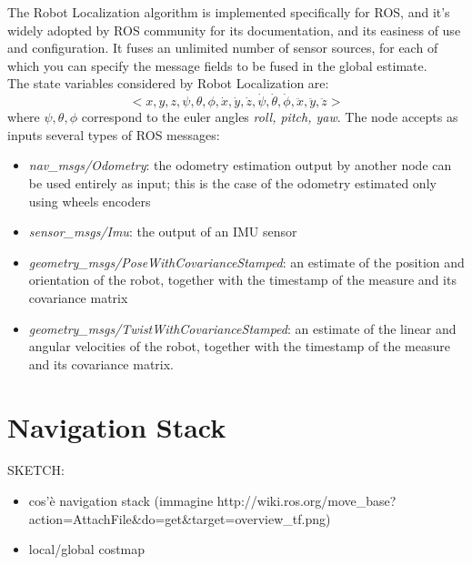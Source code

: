 The Robot Localization algorithm is implemented specifically for \ac{ROS}, and it's widely adopted by \ac{ROS} community for its documentation, and its easiness of use and configuration. It fuses an unlimited number of sensor sources, for each of which you can specify the message fields to be fused in the global estimate. \\

The state variables considered by Robot Localization are:
\begin{equation}
	<x, y, z, \psi, \theta, \phi, \dot{x}, \dot{y}, \dot{z},\dot{\psi}, \dot{\theta}, \dot{\phi}, \ddot{x}, \ddot{y}, \ddot{z}>
	\label{eq:robotLocalizationState}
\end{equation}
where $ \psi, \theta, \phi$ correspond to the euler angles \textit{roll, pitch, yaw}. 
The node accepts as inputs several types of \ac{ROS} messages:
\begin{itemize}
	\item \textit{nav\_msgs/Odometry}: the odometry estimation output by another node can be used entirely as input; this is the case of the odometry estimated only using wheels encoders
	\item \textit{sensor\_msgs/Imu}: the output of an \ac{IMU} sensor
	\item \textit{geometry\_msgs/PoseWithCovarianceStamped}: an estimate of the position and orientation of the robot, together with the timestamp of the measure and its covariance matrix
	\item \textit{geometry\_msgs/TwistWithCovarianceStamped}: an estimate of the linear and angular velocities of the robot, together with the timestamp of the measure and its covariance matrix.
\end{itemize}





\section{Navigation Stack}\label{sec:navigationStack}
SKETCH:
\begin{itemize}
	\item cos'è navigation stack (immagine http://wiki.ros.org/move\_base?action=AttachFile\&do=get\&target=overview\_tf.png)
	\item local/global costmap
\end{itemize}